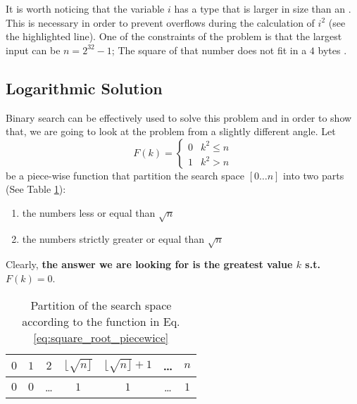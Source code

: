 

It is worth noticing that the variable $i$ has a type that is larger in size than an
. This is necessary in order to prevent overflows during the calculation of $i^2$ (see the highlighted line). 
One of the constraints of the problem is that the largest input can be $n=2^{32}-1$; The square of that number does not fit in a $4$ bytes .
	
	


\subsection{Logarithmic Solution}
Binary search can be effectively used to solve this problem and in order to show that, we are going to look at the problem from a slightly different angle. 
Let 
\begin{equation}
	F(k)=\begin{cases} 
	0 & k^2 \leq n \\
	1 & k^2 > n
\end{cases}
\label{eq:square_root_piecewice}
\end{equation} 
be a piece-wise function that partition the search space $[0\ldots n]$ into two parts (See Table
\ref{tab:sqrt_split_space}):
	\begin{enumerate}
      \item the numbers  less or equal than $\sqrt{n}$
      \item the numbers strictly greater or equal than $\sqrt{n}$
	\end{enumerate}
Clearly, \textbf{the answer we are looking for is the greatest value $k$ s.t. $F(k) = 0$}. 

\begin{table}
	\centering
	\begin{tabular}{|c|c|c|c|c|c|c|}
		\hline
		$0$ & $1$ & $2$   & $\lfloor \sqrt{n \rfloor}$ & $\lfloor \sqrt{n \rfloor}+1$ & \ldots   & $n$ \\ \hline
		$0$ & $0$ & \ldots & $1$ & $1$ & \ldots & $1$   \\ \hline
	\end{tabular}
	\caption{Partition of the search space according to the function in Eq.
	\ref{eq:square_root_piecewice}}
	\label{tab:sqrt_split_space}
\end{table}

